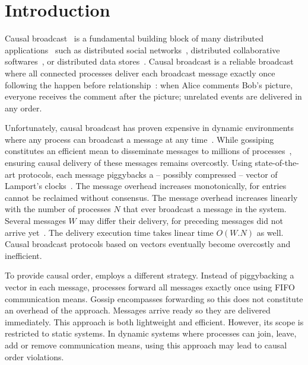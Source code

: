 
\section{Introduction}

Causal broadcast~\cite{hadzilacos1994modular} is a fundamental building block of
many distributed applications~\cite{nakamoto2009bitcoin} such as distributed
social networks~\cite{borthakur2013petabyte}, distributed collaborative
softwares~\cite{nedelec2016crate,heinrich2012exploiting}, or distributed data
stores~\cite{demers1987epidemic,shapiro2011comprehensive,bailis2013bolton,lloyd2011cops,bravo2017saturn}.
Causal broadcast is a reliable broadcast where all connected processes
deliver each broadcast message exactly once following the happen
before relationship~\cite{lamport1978time,schwarz1994detecting}: when
Alice comments Bob's picture, everyone receives the comment after the
picture; unrelated events are delivered in any order.

Unfortunately, causal broadcast has proven expensive in dynamic environments
where any process can broadcast a message at any
time~\cite{charronbost1991concerning}. While gossiping constitutes an efficient
mean to disseminate messages to millions of
processes~\cite{demers1987epidemic,birman1999bimodal}, ensuring causal
delivery of these messages remains overcostly.  Using state-of-the-art
protocols, each message piggybacks a -- possibly compressed -- vector of
Lamport's
clocks~\cite{almeida2008interval,fidge1988timestamps,mattern1989virtual,singhal1992efficient}.
The message overhead increases monotonically, for entries cannot be reclaimed
without consensus. The message overhead increases linearly with the number of
processes $N$ that ever broadcast a message in the system. Several messages $W$
may differ their delivery, for preceding messages did not arrive
yet~\cite{mehdi2017slowdown}.  The delivery execution time takes linear time
$O(W.N)$ as well.  Causal broadcast protocols based on vectors eventually become
overcostly and inefficient.


To provide causal order, \cite{friedman2004causal} employs a different
strategy. Instead of piggybacking a vector in each message, processes forward
all messages exactly once using FIFO communication means. Gossip encompasses
forwarding so this does not constitute an overhead of the approach.  Messages
arrive ready so they are delivered immediately. This approach is both
lightweight and efficient. However, its scope is restricted to static systems.
In dynamic systems where processes can join, leave, add or remove communication
means, using this approach may lead to causal order violations.


